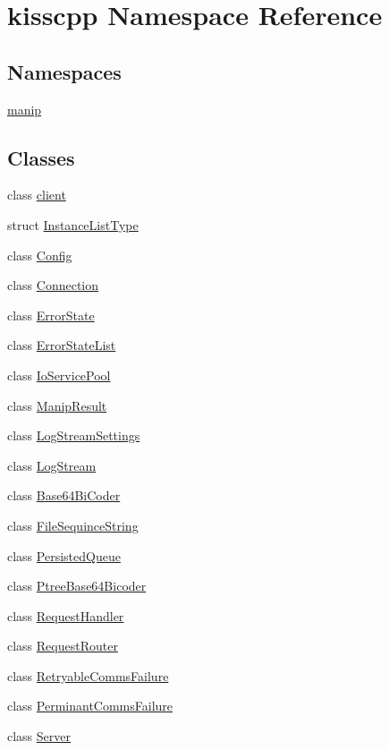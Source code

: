 \hypertarget{a00089}{\section{kisscpp Namespace Reference}
\label{a00089}
}
\subsection*{Namespaces}
\begin{DoxyCompactItemize}
\item 
\hyperlink{a00090}{manip}
\end{DoxyCompactItemize}
\subsection*{Classes}
\begin{DoxyCompactItemize}
\item 
class \hyperlink{a00020}{client}
\item 
struct \hyperlink{a00028}{Instance\-List\-Type}
\item 
class \hyperlink{a00021}{Config}
\item 
class \hyperlink{a00022}{Connection}
\item 
class \hyperlink{a00024}{Error\-State}
\item 
class \hyperlink{a00025}{Error\-State\-List}
\item 
class \hyperlink{a00029}{Io\-Service\-Pool}
\item 
class \hyperlink{a00033}{Manip\-Result}
\item 
class \hyperlink{a00032}{Log\-Stream\-Settings}
\item 
class \hyperlink{a00031}{Log\-Stream}
\item 
class \hyperlink{a00019}{Base64\-Bi\-Coder}
\item 
class \hyperlink{a00026}{File\-Sequince\-String}
\item 
class \hyperlink{a00035}{Persisted\-Queue}
\item 
class \hyperlink{a00036}{Ptree\-Base64\-Bicoder}
\item 
class \hyperlink{a00037}{Request\-Handler}
\item 
class \hyperlink{a00038}{Request\-Router}
\item 
class \hyperlink{a00039}{Retryable\-Comms\-Failure}
\item 
class \hyperlink{a00034}{Perminant\-Comms\-Failure}
\item 
class \hyperlink{a00040}{Server}

\end{DoxyCompactItemize}
